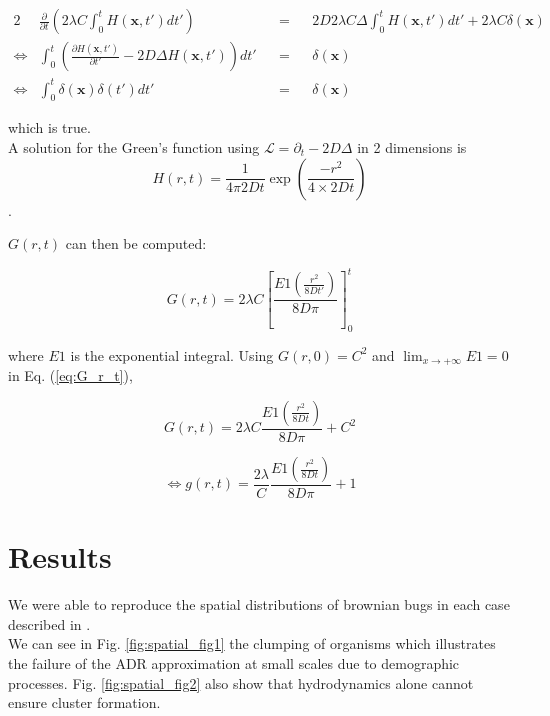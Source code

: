 \begin{alignat*}{2}
 & \frac{\partial}{\partial t}\left(2\lambda C\int_{0}^{t}H(\boldsymbol{x},t')dt'\right) & & = & & 2D2\lambda C\Delta\int_{0}^{t}H(\boldsymbol{x},t')dt'+2\lambda C\delta(\boldsymbol{x})\\
\Leftrightarrow & \int_{0}^{t}\left(\frac{\partial H(\boldsymbol{x},t')}{\partial t'}-2D\Delta H(\boldsymbol{x},t')\right)dt' & & = & & \delta(\boldsymbol{x})\\
\Leftrightarrow & \int_{0}^{t}\delta(\boldsymbol{x})\delta(t')dt' & & = & & \delta(\boldsymbol{x})
\end{alignat*}

which is true. \\

A solution for the Green's function using $\mathcal{L}=\partial_{t}-2D\Delta$
in 2 dimensions is $$H(r,t)=\frac{1}{4\pi2Dt}\exp(\frac{-r^{2}}{4\times2Dt})$$. 

$G(r,t)$ can then be computed:

\begin{equation}
G(r,t)=2\lambda C\left[\frac{E1\left(\frac{r^{2}}{8Dt'}\right)}{8D\pi}\right]_{0}^{t}\label{eq:G_r_t}
\end{equation}

where $E1$ is the exponential integral. Using $G(r,0)=C^{2}$ and
$\lim_{x\rightarrow+\infty}E1=0$ in Eq. (\ref{eq:G_r_t}), 

\begin{equation}
G(r,t)=2\lambda C\frac{E1\left(\frac{r^{2}}{8Dt}\right)}{8D\pi}+C^{2}
\end{equation}

\begin{equation}
\Leftrightarrow g(r,t)=\frac{2\lambda}{C}\frac{E1\left(\frac{r^{2}}{8Dt}\right)}{8D\pi}+1
\end{equation}

\section*{Results}

We were able to reproduce the spatial distributions of brownian bugs in each case described in \cite{young_reproductive_2001}.\\

We can see in Fig. \ref{fig:spatial_fig1} the clumping of organisms which illustrates the failure of the ADR approximation at small scales due to demographic processes. Fig. \ref{fig:spatial_fig2} also show that hydrodynamics alone cannot ensure cluster formation.  

